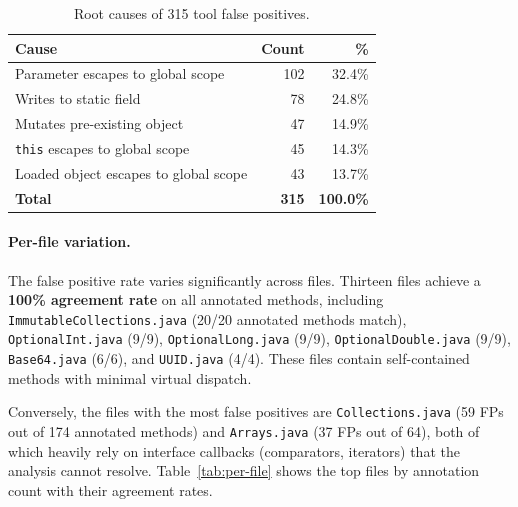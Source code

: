 \begin{table}[h]
\centering
\caption{Root causes of 315 tool false positives.}
\label{tab:fp-causes}
\begin{tabular}{lrr}
\toprule
\textbf{Cause} & \textbf{Count} & \textbf{\%} \\
\midrule
Parameter escapes to global scope   & 102 & 32.4\% \\
Writes to static field              &  78 & 24.8\% \\
Mutates pre-existing object         &  47 & 14.9\% \\
\texttt{this} escapes to global scope &  45 & 14.3\% \\
Loaded object escapes to global scope &  43 & 13.7\% \\
\midrule
\textbf{Total}                        & \textbf{315} & \textbf{100.0\%} \\
\bottomrule
\end{tabular}
\end{table}

\paragraph{Per-file variation.}
The false positive rate varies significantly across files.
Thirteen files achieve a \textbf{100\% agreement rate} on all annotated methods, including \texttt{ImmutableCollections.java} (20/20 annotated methods match), \texttt{OptionalInt.java} (9/9), \texttt{OptionalLong.java} (9/9), \texttt{OptionalDouble.java} (9/9), \texttt{Base64.java} (6/6), and \texttt{UUID.java} (4/4).
These files contain self-contained methods with minimal virtual dispatch.

Conversely, the files with the most false positives are \texttt{Collections.java} (59 FPs out of 174 annotated methods) and \texttt{Arrays.java} (37 FPs out of 64), both of which heavily rely on interface callbacks (comparators, iterators) that the analysis cannot resolve.
Table~\ref{tab:per-file} shows the top files by annotation count with their agreement rates.

